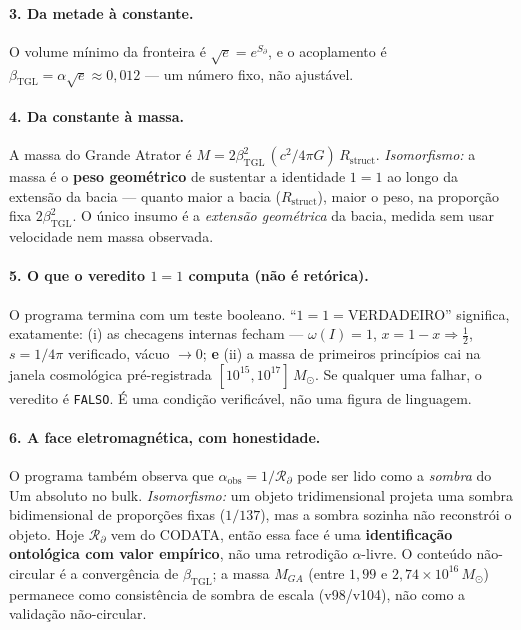 \documentclass[11pt]{article}
\newcommand{\bTGL}{\beta_{\mathrm{TGL}}}\newcommand{\Msun}{M_{\odot}}\newcommand{\TGL}{\mathrm{TGL}}
\theoremstyle{definition}\newtheorem{deriv}{Derivação}
\begin{document}
\paragraph{3. Da metade à constante.} O volume mínimo da fronteira é $\sqrt e=e^{S_\partial}$, e o acoplamento é $\bTGL=\alpha\sqrt e\approx0{,}012$ --- um número fixo, não ajustável.

\paragraph{4. Da constante à massa.} A massa do Grande Atrator é $M=2\bTGL^2\,(c^2/4\pi G)\,R_{\mathrm{struct}}$. \emph{Isomorfismo:} a massa é o \textbf{peso geométrico} de sustentar a identidade $1=1$ ao longo da extensão da bacia --- quanto maior a bacia ($R_{\mathrm{struct}}$), maior o peso, na proporção fixa $2\bTGL^2$. O único insumo é a \emph{extensão geométrica} da bacia, medida sem usar velocidade nem massa observada.

\paragraph{5. O que o veredito $1=1$ computa (não é retórica).} O programa termina com um teste booleano. ``$1=1=$VERDADEIRO'' significa, exatamente: (i) as checagens internas fecham --- $\omega(I)=1$, $x=1-x\Rightarrow\tfrac12$, $s=1/4\pi$ verificado, vácuo $\to0$; \textbf{e} (ii) a massa de primeiros princípios cai na janela cosmológica pré-registrada $[10^{15},10^{17}]\,\Msun$. Se qualquer uma falhar, o veredito é \texttt{FALSO}. É uma condição verificável, não uma figura de linguagem.

\paragraph{6. A face eletromagnética, com honestidade.} O programa também observa que $\alpha_{\mathrm{obs}}=1/\mathcal{R}_\partial$ pode ser lido como a \emph{sombra} do Um absoluto no bulk. \emph{Isomorfismo:} um objeto tridimensional projeta uma sombra bidimensional de proporções fixas ($1/137$), mas a sombra sozinha não reconstrói o objeto. Hoje $\mathcal{R}_\partial$ vem do CODATA, então essa face é uma \textbf{identificação ontológica com valor empírico}, não uma retrodição $\alpha$-livre. O conteúdo não-circular é a convergência de $\bTGL$; a massa $M_{GA}$ (entre $1{,}99$ e $2{,}74\times10^{16}\,\Msun$) permanece como consistência de sombra de escala (v98/v104), não como a validação não-circular.
\end{document}
